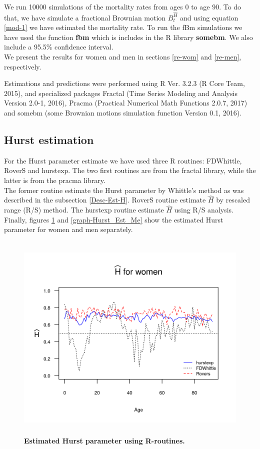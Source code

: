 \documentclass[smallextended]{svjour3}
\begin{document}
We run 10000 simulations of the mortality rates from ages $0$ to age $90$. To
do that, we have simulate a fractional Brownian motion $B_t^{\hat H}$ and using
equation \eqref{mod-1} we have estimated the mortality rate. To run the fBm
simulations we have used the function {\bf fbm} which is includes in the R
library {\bf somebm}.  We also include a  95.5\% confidence interval.\\


We present the results for women and men in sections \ref{re-wom} and
\ref{re-men}, respectively.

Estimations and predictions were performed using R Ver. 3.2.3 (R Core Team,
2015), and specialized packages
Fractal (Time Series Modeling and Analysis
Version 2.0-1, 2016), Pracma (Practical Numerical Math Functions 2.0.7, 2017)
and somebm (some Brownian motions simulation function Version 0.1, 2016).


\subsection{Hurst estimation}\label{hu-est}

For the Hurst parameter estimate we have used three R routines: FDWhittle,
RoverS and hurstexp.
The two first routines are from the fractal library, while the latter is from
the pracma library.\\

The former routine estimate the Hurst parameter by Whittle's method as was
described in the subsection \ref{Desc-Est-H}. RoverS routine
estimate $\hat H $ by rescaled range (R/S) method. The hurstexp routine
estimate $\hat H $  using
R/S analysis. \\

Finally, figures \ref{graph-Hurst_Est_Wo} and \ref{graph-Hurst_Est_Me} show
the estimated Hurst parameter for women and men separately.

\begin{figure}[H]
    \includegraphics[width = 4.5in,  height=4in]{Hurst-Women.png}
    \caption{\bf Estimated Hurst parameter using R-routines.}
    \label{graph-Hurst_Est_Wo}
\end{figure}\vspace*{0.1cm}
\end{document}
